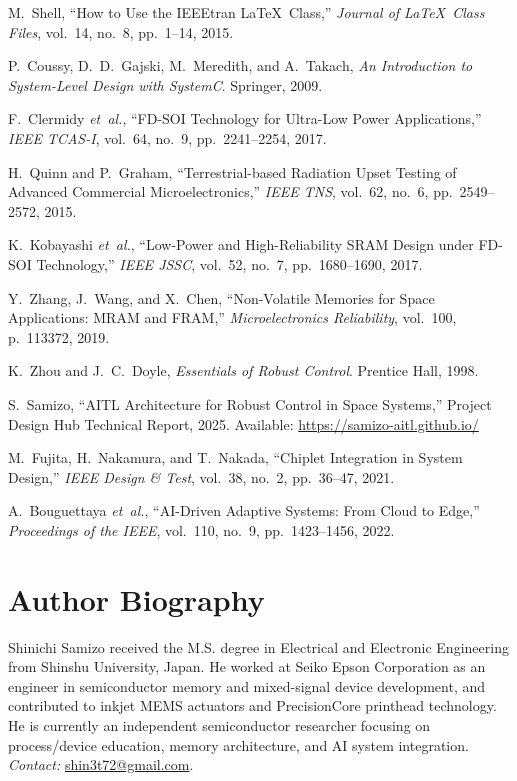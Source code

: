 \documentclass[conference]{IEEEtran}
\newcommand{\etal}{\textit{et~al.}}
\begin{document}
\begin{thebibliography}{10}

M.~Shell, ``How to Use the IEEEtran \LaTeX\ Class,'' \emph{Journal of \LaTeX\ Class Files}, vol.~14, no.~8, pp.~1--14, 2015.

P.~Coussy, D.~D.~Gajski, M.~Meredith, and A.~Takach, \emph{An Introduction to System-Level Design with SystemC}. Springer, 2009.

F.~Clermidy \etal, ``FD-SOI Technology for Ultra-Low Power Applications,'' \emph{IEEE TCAS-I}, vol.~64, no.~9, pp.~2241--2254, 2017.

H.~Quinn and P.~Graham, ``Terrestrial-based Radiation Upset Testing of Advanced Commercial Microelectronics,'' \emph{IEEE TNS}, vol.~62, no.~6, pp.~2549--2572, 2015.

K.~Kobayashi \etal, ``Low-Power and High-Reliability SRAM Design under FD-SOI Technology,'' \emph{IEEE JSSC}, vol.~52, no.~7, pp.~1680--1690, 2017.

Y.~Zhang, J.~Wang, and X.~Chen, ``Non-Volatile Memories for Space Applications: MRAM and FRAM,'' \emph{Microelectronics Reliability}, vol.~100, p.~113372, 2019.

K.~Zhou and J.~C.~Doyle, \emph{Essentials of Robust Control}. Prentice Hall, 1998.

S.~Samizo, ``AITL Architecture for Robust Control in Space Systems,'' Project Design Hub Technical Report, 2025. Available: \url{https://samizo-aitl.github.io/}

M.~Fujita, H.~Nakamura, and T.~Nakada, ``Chiplet Integration in System Design,'' \emph{IEEE Design \& Test}, vol.~38, no.~2, pp.~36--47, 2021.

A.~Bouguettaya \etal, ``AI-Driven Adaptive Systems: From Cloud to Edge,'' \emph{Proceedings of the IEEE}, vol.~110, no.~9, pp.~1423--1456, 2022.

\end{thebibliography}

\section*{Author Biography}
Shinichi Samizo received the M.S. degree in Electrical and Electronic Engineering from Shinshu University, Japan. He worked at Seiko Epson Corporation as an engineer in semiconductor memory and mixed-signal device development, and contributed to inkjet MEMS actuators and PrecisionCore printhead technology. He is currently an independent semiconductor researcher focusing on process/device education, memory architecture, and AI system integration.\\
\emph{Contact:} \href{mailto:shin3t72@gmail.com}{shin3t72@gmail.com}.
\end{document}
